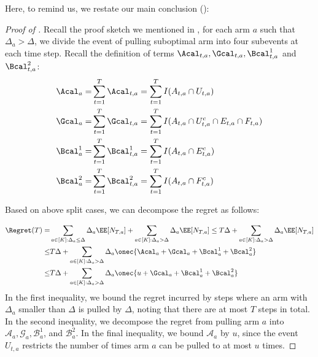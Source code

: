 Here, to remind us, we restate our main conclusion ():
\mainregret*




\begin{proof}[Proof of ]

Recall the proof sketch we mentioned in , for each arm $a$ such that $\Delta_a > \Delta$, we divide the event of pulling suboptimal arm into four subevents at each time step. Recall the definition of terms $\Acal_{t,a}, \Gcal_{t,a}, \Bcal^1_{t,a}$ and $\Bcal^2_{t,a}$:
\begin{align*}
\Acal_a =& \sum_{t=1}^T \Acal_{t, a} = \sum_{t=1}^T I(A_{t,a} \cap U_{t,a}) \\
    \Gcal_a =& \sum_{t=1}^T \Gcal_{t, a} = \sum_{t=1}^T I(A_{t,a} \cap U_{t,a}^c \cap E_{t,a} \cap F_{t,a}) \\
    \Bcal_a^1 =& \sum_{t=1}^T \Bcal_{t, a}^1 = \sum_{t=1}^T I(A_{t,a} \cap E_{t,a}^c) \\
    \Bcal_a^2 =& \sum_{t=1}^T \Bcal_{t, a}^2 = \sum_{t=1}^T I(A_{t,a} \cap F_{t,a}^c)
\end{align*}




Based on above split cases, we can decompose the regret as follows:

\begin{align}
    \Regret(T) 
    =& \sum_{a\in[K]:\Delta_a \leq \Delta} \Delta_a \EE[N_{T,a}] + \sum_{a\in[K]:\Delta_a > \Delta} \Delta_a \EE[N_{T,a}]
    \leq T\Delta + \sum_{a\in[K]:\Delta_a > \Delta} \Delta_a \EE[N_{T,a}]
        \nonumber
    \\
    \leq&
        T \Delta + \sum_{a\in[K]:\Delta_a > \Delta}  \Delta_a \onec{\Acal_{a} + \Gcal_{a} + \Bcal^1_{a} + \Bcal^2_{a}} 
        \nonumber
    \\
    \leq&
        T \Delta + \sum_{a\in[K]:\Delta_a > \Delta}  \Delta_a \onec{u + \Gcal_{a} + \Bcal^1_{a} + \Bcal^2_{a}}
\end{align}
    In the first inequality, we bound the regret incurred by steps where an arm with $\Delta_a$ smaller than $\Delta$ is pulled by $\Delta$, noting that there are at most $T$ steps in total. 
    In the second inequality, we decompose the regret from pulling arm $a$ into $\mathcal{A}_{a}, \mathcal{G}_{a}, \mathcal{B}^1_{a}$, and $\mathcal{B}^2_{a}$. 
    In the final inequality, we bound $\mathcal{A}_{a}$ by $u$, since the event $U_{t, a}$ restricts the number of times arm $a$ can be pulled to at most $u$ times.


\end{proof}
